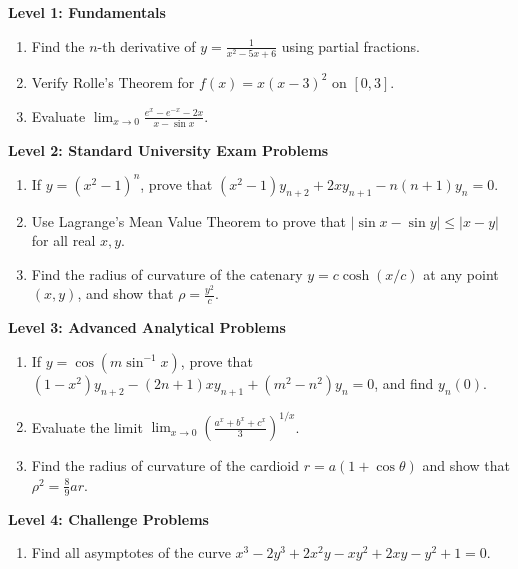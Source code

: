 \begin{practiceset}
\noindent\textbf{Level 1: Fundamentals}
\begin{enumerate}[leftmargin=1.5em]
    \item Find the $n$-th derivative of $y = \frac{1}{x^2 - 5x + 6}$ using partial fractions.
    \item Verify Rolle's Theorem for $f(x) = x(x-3)^2$ on $[0, 3]$.
    \item Evaluate $\lim_{x\to 0} \frac{e^x - e^{-x} - 2x}{x - \sin x}$.
\end{enumerate}

\medskip
\noindent\textbf{Level 2: Standard University Exam Problems}
\begin{enumerate}[leftmargin=1.5em, start=4]
    \item If $y = (x^2-1)^n$, prove that $(x^2-1)y_{n+2} + 2x y_{n+1} - n(n+1)y_n = 0$.
    \item Use Lagrange's Mean Value Theorem to prove that $|\sin x - \sin y| \le |x - y|$ for all real $x, y$.
    \item Find the radius of curvature of the catenary $y = c \cosh(x/c)$ at any point $(x,y)$, and show that $\rho = \frac{y^2}{c}$.
\end{enumerate}

\medskip
\noindent\textbf{Level 3: Advanced Analytical Problems}
\begin{enumerate}[leftmargin=1.5em, start=7]
    \item If $y = \cos(m\sin^{-1}x)$, prove that $(1-x^2)y_{n+2} - (2n+1)xy_{n+1} + (m^2-n^2)y_n = 0$, and find $y_n(0)$.
    \item Evaluate the limit $\lim_{x\to 0} \left(\frac{a^x + b^x + c^x}{3}\right)^{1/x}$.
    \item Find the radius of curvature of the cardioid $r = a(1+\cos\theta)$ and show that $\rho^2 = \frac{8}{9} a r$.
\end{enumerate}

\medskip
\noindent\textbf{Level 4: Challenge Problems}
\begin{enumerate}[leftmargin=1.5em, start=10]
    \item Find all asymptotes of the curve $x^3 - 2y^3 + 2x^2y - xy^2 + 2xy - y^2 + 1 = 0$.
\end{enumerate}
\end{practiceset}

